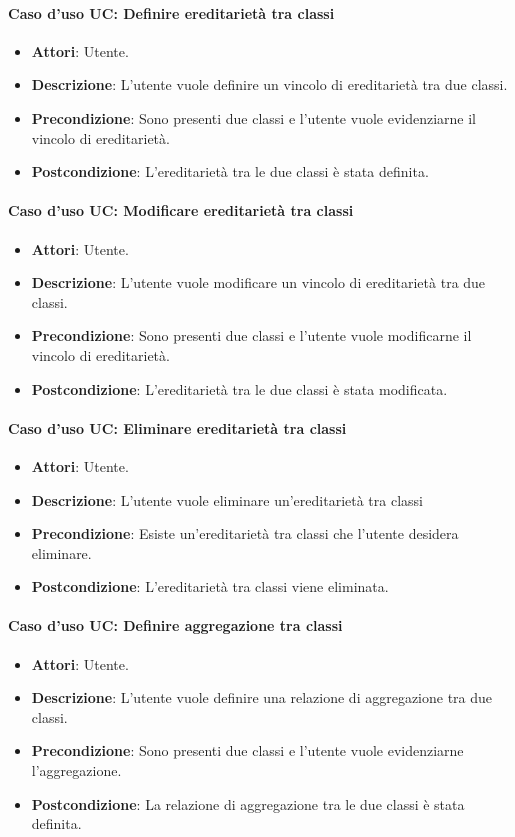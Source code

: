 \paragraph{Caso d'uso UC: Definire ereditarietà tra classi}
\begin{itemize}
	\item\textbf{Attori}: Utente.
	\item\textbf{Descrizione}: L'utente vuole definire un vincolo di ereditarietà tra due classi.
	\item\textbf{Precondizione}: Sono presenti due classi e l'utente vuole evidenziarne il vincolo di ereditarietà.
	\item\textbf{Postcondizione}: L'ereditarietà tra le due classi è stata definita.
\end{itemize}

\paragraph{Caso d'uso UC: Modificare ereditarietà tra classi}
\begin{itemize}
	\item\textbf{Attori}: Utente.
	\item\textbf{Descrizione}: L'utente vuole modificare un vincolo di ereditarietà tra due classi.
	\item\textbf{Precondizione}: Sono presenti due classi e l'utente vuole modificarne il vincolo di ereditarietà.
	\item\textbf{Postcondizione}: L'ereditarietà tra le due classi è stata modificata.
\end{itemize}

\paragraph{Caso d'uso UC: Eliminare ereditarietà tra classi}
\begin{itemize}
	\item\textbf{Attori}: Utente.
	\item\textbf{Descrizione}: L'utente vuole eliminare un'ereditarietà tra classi
	\item\textbf{Precondizione}: Esiste un'ereditarietà tra classi che l'utente desidera eliminare.
	\item\textbf{Postcondizione}: L'ereditarietà tra classi viene eliminata.
\end{itemize}

\paragraph{Caso d'uso UC: Definire aggregazione tra classi}
\begin{itemize}
	\item\textbf{Attori}: Utente.
	\item\textbf{Descrizione}: L'utente vuole definire una relazione di aggregazione tra due classi.
	\item\textbf{Precondizione}: Sono presenti due classi e l'utente vuole evidenziarne l'aggregazione.
	\item\textbf{Postcondizione}: La relazione di aggregazione tra le due classi è stata definita.
\end{itemize}

